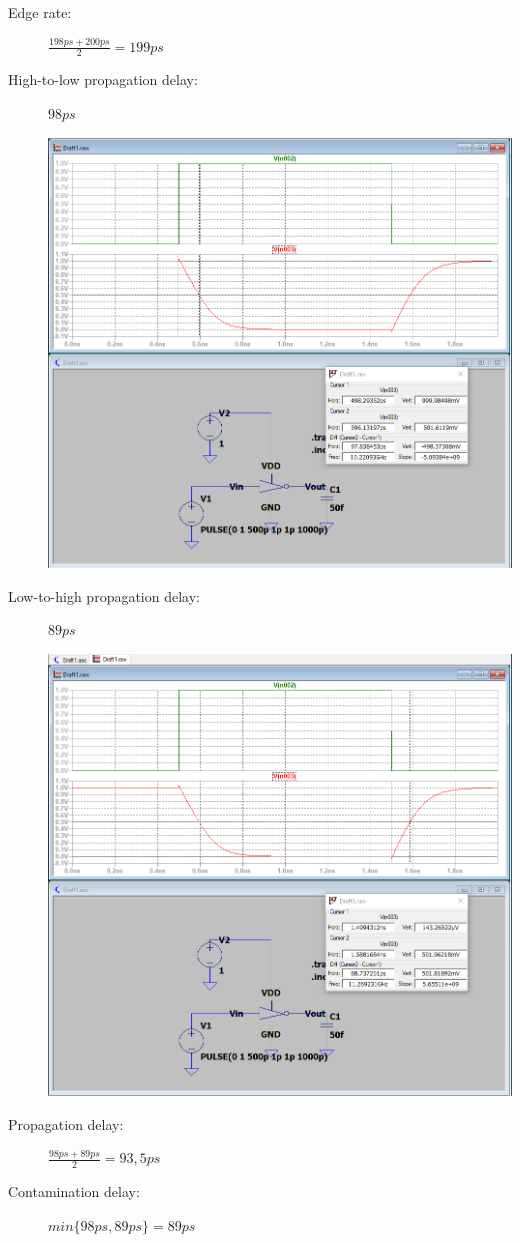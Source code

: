 \documentclass[a4paper, 11pt]{article}
\begin{document}
\begin{description}
\begin{center}
	      \end{center}
	\item[Edge rate:] $\frac{198ps + 200ps}{2} = 199ps$
	\item[High-to-low propagation delay:] $98ps$ \hfill
	      \begin{center}
		      \includegraphics[scale=0.38]{mikro_lab3/high_to_low.PNG}
	      \end{center}
	      \pagebreak
	\item[Low-to-high propagation delay:] $89ps$ \hfill
	      \begin{center}
		      \includegraphics[scale=0.38]{mikro_lab3/low_to_high.PNG}
	      \end{center}
	\item[Propagation delay:] $\frac{98ps + 89ps}{2} = 93,5ps $
	\item[Contamination delay:] $ min\{98ps, 89ps\} = 89ps $
\end{description}
\end{document}
